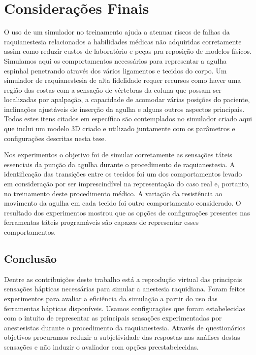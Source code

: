 \chapter{Considerações Finais} \label{cap:cap6}

O uso de um simulador no treinamento ajuda a atenuar riscos de falhas da raquianestesia relacionados a habilidades médicas não adquiridas corretamente assim como reduzir custos de laboratório e peças pra reposição de modelos físicos. Simulamos aqui os comportamentos necessários para representar a agulha espinhal penetrando através dos vários ligamentos e tecidos do corpo. Um simulador de raquianestesia de alta fidelidade requer recursos como haver uma região das costas com a sensação de vértebras da coluna que possam ser localizadas por apalpação, a capacidade de acomodar várias posições do paciente, inclinações ajustáveis de inserção da agulha e alguns outros aspectos principais. Todos estes itens citados em específico são contemplados no simulador criado aqui que inclui um modelo 3D criado e utilizado juntamente com os parâmetros e configurações descritas nesta tese. 

Nos experimentos o objetivo foi de simular corretamente as sensações táteis essenciais da punção da agulha durante o procedimento de raquianestesia. A identificação das transições entre os tecidos foi um dos comportamentos levado em consideração por ser imprescindível na representação do caso real e, portanto, no treinamento deste procedimento médico.
A variação da resistência ao movimento da agulha em cada tecido foi outro comportamento considerado. O resultado dos experimentos mostrou que as opções de configurações presentes nas ferramentas táteis programáveis são capazes de representar esses comportamentos.

\section{Conclusão}
\label{sec:conclusão}

Dentre as contribuições deste trabalho está a reprodução virtual das principais sensações hápticas necessárias para simular a anestesia raquidiana. Foram feitos experimentos para avaliar a eficiência da simulação a partir do uso das ferramentas hápticas disponíveis. Usamos configurações que foram estabelecidas com o intuito de representar as principais sensações experimentadas por anestesistas durante o procedimento da raquianestesia. Através de questionários objetivos  procuramos reduzir a subjetividade das respostas nas análises destas sensações e não induzir o avaliador com opções preestabelecidas.  

